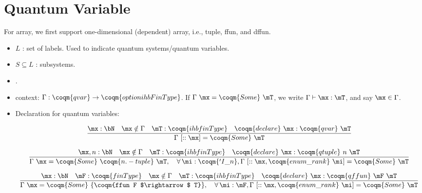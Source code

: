 
\section{Quantum Variable}

For array, we first support one-dimensional (dependent) array, i.e., tuple, ffun, and dffun.

\begin{itemize}
    \item $L$ : set of labels. Used to indicate quantum systems/quantum variables.
    \item $S\subseteq L$ : subsystems.
    \item {}.
    \item context: $\Gamma : \coqm{qvar}\rightarrow\coqm{option ihbFinType}$.
    If $\Gamma\ \mx = \coqm{Some}\ \mT$, we write $\Gamma\vdash \mx : \mT$, and say $\mx\in\Gamma$.
    \item Declaration for quantum variables: 
    
    $$\frac{\mx : \bN\quad \mx\notin\Gamma\quad\mT:\coqm{ihbfinType}\quad\coqm{declare}\ \mx : \coqm{qvar}\ \mT}{\Gamma\ [::\mx] = \coqm{Some}\ \mT}$$
    
    
    $$\frac{\mx,n: \bN\quad\mx\notin\Gamma\quad\mT:\coqm{ihbfinType}\quad\coqm{declare}\ \mx : \coqm{qtuple}\ n\ \mT}{\Gamma\ \mx = \coqm{Some}\ \coqm{n.-tuple}\ \mT,\quad \forall\,\mi:\coqm{'I\_n}, \Gamma\ [::\mx,\coqm{enum\_rank}\ \mi] = \coqm{Some}\ \mT}$$
    
    $$\frac{\mx : \bN\quad\mF:\coqm{finType}\quad \mx\notin\Gamma\quad\mT:\coqm{ihbfinType}\quad\coqm{declare}\ \mx : \coqm{qffun}\ \mF\ \mT}{\Gamma\ \mx = \coqm{Some}\ \{\coqm{ffun F $\rightarrow$ T}\},\quad \forall\,\mi:\mF, \Gamma\ [::\mx,\coqm{enum\_rank}\ \mi] = \coqm{Some}\ \mT}$$
    

\end{itemize}
